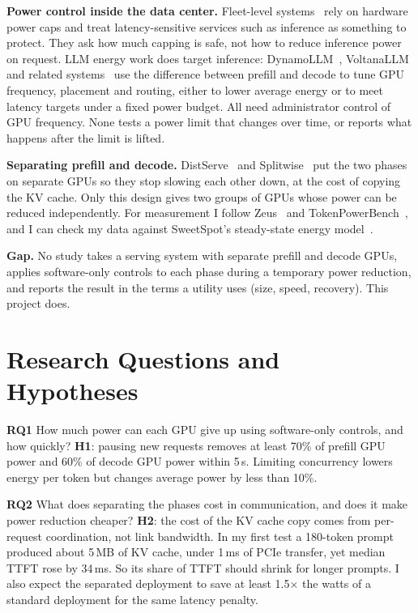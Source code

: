 \documentclass[conference,10pt]{IEEEtran}
\newcommand{\RQ}[1]{\textbf{RQ#1}}
\newcommand{\hy}[1]{\textbf{H#1}}
\begin{document}
\textbf{Power control inside the data center.} Fleet-level systems~\cite{wu2016dynamo,li2020thunderbolt,patel2024polca} rely on hardware power caps and treat latency-sensitive services such as inference as something to protect. They ask how much capping is safe, not how to reduce inference power on request. LLM energy work does target inference: DynamoLLM~\cite{stojkovic2025dynamollm}, VoltanaLLM~\cite{yu2026voltana} and related systems~\cite{qiu2024userve,kakolyris2024slo,dualscale2026,rapid2026} use the difference between prefill and decode to tune GPU frequency, placement and routing, either to lower average energy or to meet latency targets under a fixed power budget. All need administrator control of GPU frequency. None tests a power limit that changes over time, or reports what happens after the limit is lifted.

\textbf{Separating prefill and decode.} DistServe~\cite{zhong2024distserve} and Splitwise~\cite{patel2024splitwise} put the two phases on separate GPUs so they stop slowing each other down, at the cost of copying the KV cache. Only this design gives two groups of GPUs whose power can be reduced independently. For measurement I follow Zeus~\cite{you2023zeus} and TokenPowerBench~\cite{niu2026tokenpowerbench}, and I can check my data against SweetSpot's steady-state energy model~\cite{cavagna2026sweetspot}.

\textbf{Gap.} No study takes a serving system with separate prefill and decode GPUs, applies software-only controls to each phase during a temporary power reduction, and reports the result in the terms a utility uses (size, speed, recovery). This project does.

\section{Research Questions and Hypotheses}
\RQ{1} How much power can each GPU give up using software-only controls, and how quickly? \hy{1}: pausing new requests removes at least 70\% of prefill GPU power and 60\% of decode GPU power within 5\,s. Limiting concurrency lowers energy per token but changes average power by less than 10\%.

\RQ{2} What does separating the phases cost in communication, and does it make power reduction cheaper? \hy{2}: the cost of the KV cache copy comes from per-request coordination, not link bandwidth. In my first test a 180-token prompt produced about 5\,MB of KV cache, under 1\,ms of PCIe transfer, yet median TTFT rose by 34\,ms. So its share of TTFT should shrink for longer prompts. I also expect the separated deployment to save at least 1.5$\times$ the watts of a standard deployment for the same latency penalty.
\end{document}
